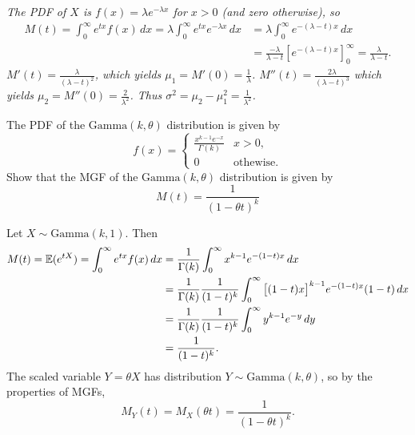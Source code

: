 \begin{solution}
\ben
\it %
The PDF of $X$ is $f(x)=\lambda e^{-\lambda x}$ for $x>0$ (and zero otherwise), so
\begin{align*}
M(t) 
	= \int_0^\infty e^{tx} f(x)\,dx 
	= \lambda \int_0^\infty e^{tx} e^{-\lambda x}\,dx 
	& = \lambda \int_0^\infty e^{-(\lambda-t)x}\,dx \\
	& = \frac{-\lambda}{\lambda-t} \left[e^{-(\lambda-t)x}\right]_0^\infty
	= \frac{\lambda}{\lambda-t}.
\end{align*}
\it %
\bit
\it $M'(t) = \displaystyle \frac{\lambda}{(\lambda-t)^2}$, which yields $\mu_1 = M'(0)  = \displaystyle\frac{1}{\lambda}$.
\it $M''(t) = \displaystyle \frac{2\lambda}{(\lambda-t)^3}$ which yields $\mu_2 = M''(0)  = \displaystyle\frac{2}{\lambda^2}$.
\it Thus $\sigma^2 = \mu_2 - \mu_1^2 = \displaystyle\frac{1}{\lambda^2}$.
\eit
\een
\end{solution}

\begin{example}
The PDF of the $\text{Gamma}(k,\theta)$ distribution is given by
\[
f(x) = \left\{\begin{array}{ll}
	\displaystyle\frac{x^{k-1}e^{-x}}{\Gamma(k)} & x>0, \\
	0 & \text{othewise.}
\end{array}\right.
\]
Show that the MGF of the $\text{Gamma}(k,\theta)$ distribution is given by
\[
M(t) = \frac{1}{(1-\theta t)^k}
\]
\end{example}

\begin{solution}
Let $X\sim\text{Gamma}(k,1)$. Then
%
\begin{align*}
M(t) = \mathbb{E}(e^{tX})
	= \int_0^\infty e^{tx} f(x)\,dx 
	& = \frac{1}{\Gamma(k)}\int_0^\infty x^{k-1}e^{-(1-t)x}\,dx \\
	& = \frac{1}{\Gamma(k)}\frac{1}{(1-t)^k}\int_0^\infty \big[(1-t)x\big]^{k-1}e^{-(1-t)x}(1-t)\,dx \\
	& = \frac{1}{\Gamma(k)}\frac{1}{(1-t)^k}\int_0^\infty y^{k-1} e^{-y}\,dy \\
	& = \frac{1}{(1-t)^k}.
\end{align*}
The scaled variable $Y=\theta X$ has distribution $Y\sim\text{Gamma}(k,\theta)$, so by the properties of MGFs, 
\[
M_Y(t) = M_X(\theta t) = \frac{1}{(1-\theta t)^k}.
\]
\end{solution}

